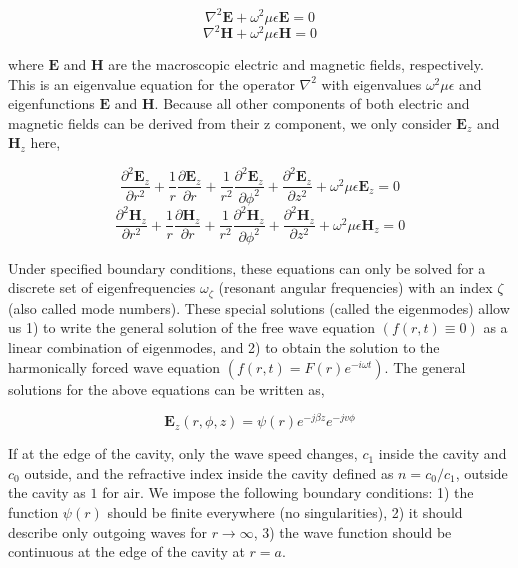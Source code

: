 \begin{equation}
  {\nabla}^2\bm{E} + {\omega}^2\mu\epsilon\bm{E} = 0
\end{equation}
\begin{equation}
  {\nabla}^2\bm{H} + {\omega}^2\mu\epsilon\bm{H} = 0
\end{equation}

where $\bm{E}$ and $\bm{H}$ are the macroscopic electric and magnetic fields,
respectively. This is an eigenvalue equation for the operator $\nabla^2$ with
eigenvalues ${\omega}^2\mu\epsilon$ and eigenfunctions $\bm{E}$ and $\bm{H}$.
Because all other components of both electric and magnetic fields can be
derived from their z component, we only consider $\bm{E}_z$ and $\bm{H}_z$
here,

\begin{equation}
  \frac{{\partial}^2\bm{E}_z}{\partial{r^2}} +\frac{1}{r}\frac{\partial\bm{E}_z}{\partial{r}} +\frac{1}{r^2}\frac{{\partial}^2\bm{E}_z}{\partial{{\phi}^2}} + \frac{{\partial}^2\bm{E}_z}{\partial{z^2}} +{\omega}^2\mu\epsilon\bm{E}_z = 0
\end{equation}
\begin{equation}
  \frac{{\partial}^2\bm{H}_z}{\partial{r^2}} +\frac{1}{r}\frac{\partial\bm{H}_z}{\partial{r}} +\frac{1}{r^2}\frac{{\partial}^2\bm{H}_z}{\partial{{\phi}^2}} + \frac{{\partial}^2\bm{H}_z}{\partial{z^2}} +{\omega}^2\mu\epsilon\bm{H}_z = 0
\end{equation}

Under specified boundary conditions, these equations can only be solved for a
discrete set of eigenfrequencies $\omega_\zeta$ (resonant angular frequencies)
with an index $\zeta$ (also called mode numbers). These special solutions
(called the eigenmodes) allow us 1) to write the general solution of the free
wave equation $(f(r,t)\equiv0)$ as a linear combination of eigenmodes, and 2)
to obtain the solution to the harmonically forced wave equation $(f(r,t) =
F(r)e^{-i\omega{t}})$. The general solutions for the above equations can be
written as,

\begin{equation}
  \bm{E}_z(r,\phi,z)=\psi(r)e^{-j\beta{z}}e^{-jv\phi}
\end{equation}

If at the edge of the cavity, only the wave speed changes, $c_1$ inside the
cavity and $c_0$ outside, and the refractive index inside the cavity defined as
$n=c_0/c_1$, outside the cavity as $1$ for air. We impose the following
boundary conditions: 1) the function $\psi(r)$ should be finite everywhere (no
singularities), 2) it should describe only outgoing waves for
$r\rightarrow\infty$, 3) the wave function should be continuous at the edge of
the cavity at $r=a$.


